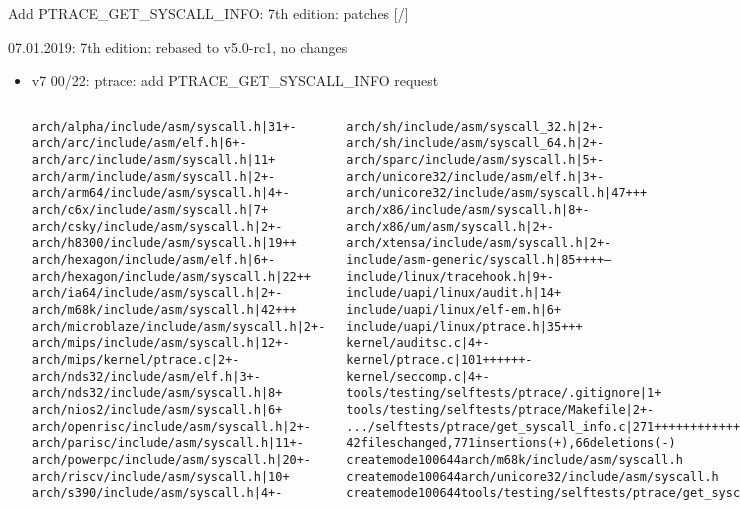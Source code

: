 \documentclass[unicode,aspectratio=169,xcolor={table,dvipsnames,usernames}]{beamer}
\begin{document}
\begin{frame}[fragile]{Add PTRACE\_GET\_SYSCALL\_INFO: 7th edition: patches \hfill [\insertframenumber/\inserttotalframenumber]}
\Large
\begin{block}{07.01.2019: 7th edition: rebased to v5.0-rc1, no changes}
\begin{itemize}
	\item v7 00/22: ptrace: add PTRACE\_GET\_SYSCALL\_INFO request
\begin{columns}
\tiny
	\column{4.5cm}
\begin{alltt}
arch/alpha/include/asm/syscall.h      |  31 +-
arch/arc/include/asm/elf.h            |   6 +-
arch/arc/include/asm/syscall.h        |  11 +
arch/arm/include/asm/syscall.h        |   2 +-
arch/arm64/include/asm/syscall.h      |   4 +-
arch/c6x/include/asm/syscall.h        |   7 +
arch/csky/include/asm/syscall.h       |   2 +-
arch/h8300/include/asm/syscall.h      |  19 ++
arch/hexagon/include/asm/elf.h        |   6 +-
arch/hexagon/include/asm/syscall.h    |  22 ++
arch/ia64/include/asm/syscall.h       |   2 +-
arch/m68k/include/asm/syscall.h       |  42 +++
arch/microblaze/include/asm/syscall.h |   2 +-
arch/mips/include/asm/syscall.h       |  12 +-
arch/mips/kernel/ptrace.c             |   2 +-
arch/nds32/include/asm/elf.h          |   3 +-
arch/nds32/include/asm/syscall.h      |   8 +
arch/nios2/include/asm/syscall.h      |   6 +
arch/openrisc/include/asm/syscall.h   |   2 +-
arch/parisc/include/asm/syscall.h     |  11 +-
arch/powerpc/include/asm/syscall.h    |  20 +-
arch/riscv/include/asm/syscall.h      |  10 +
arch/s390/include/asm/syscall.h       |   4 +-
\end{alltt}
	\column{8cm}
\begin{alltt}
arch/sh/include/asm/syscall_32.h              |   2 +-
arch/sh/include/asm/syscall_64.h              |   2 +-
arch/sparc/include/asm/syscall.h              |   5 +-
arch/unicore32/include/asm/elf.h              |   3 +-
arch/unicore32/include/asm/syscall.h          |  47 +++
arch/x86/include/asm/syscall.h                |   8 +-
arch/x86/um/asm/syscall.h                     |   2 +-
arch/xtensa/include/asm/syscall.h             |   2 +-
include/asm-generic/syscall.h                 |  85 ++++--
include/linux/tracehook.h                     |   9 +-
include/uapi/linux/audit.h                    |  14 +
include/uapi/linux/elf-em.h                   |   6 +
include/uapi/linux/ptrace.h                   |  35 +++
kernel/auditsc.c                              |   4 +-
kernel/ptrace.c                               | 101 ++++++-
kernel/seccomp.c                              |   4 +-
tools/testing/selftests/ptrace/.gitignore     |   1 +
tools/testing/selftests/ptrace/Makefile       |   2 +-
.../selftests/ptrace/get_syscall_info.c       | 271 ++++++++++++++++++
42 files changed, 771 insertions(+), 66 deletions(-)
create mode 100644 arch/m68k/include/asm/syscall.h
create mode 100644 arch/unicore32/include/asm/syscall.h
create mode 100644 tools/testing/selftests/ptrace/get_syscall_info.c
\end{alltt}
\end{columns}
\end{itemize}
\end{block}
\end{frame}
\end{document}
